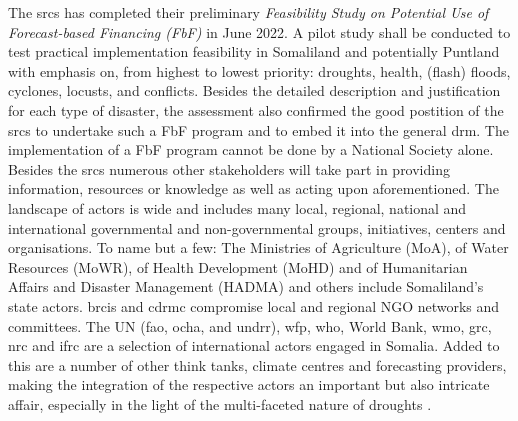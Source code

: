 The \acrfull{srcs} has completed their preliminary \textit{Feasibility Study on Potential Use of Forecast-based Financing (FbF)} in June 2022. A pilot study shall be conducted to test practical implementation feasibility in Somaliland and potentially Puntland with emphasis on, from highest to lowest priority: droughts, health, (flash) floods, cyclones, locusts, and conflicts. Besides the detailed description and justification for each type of disaster, the assessment also confirmed the good postition of the \acrshort{srcs} to undertake such a FbF program and to embed it into the general \acrlong{drm}.\newline
The implementation of a FbF program cannot be done by a National Society alone. Besides the \acrshort{srcs} numerous other stakeholders will take part in providing information, resources or knowledge as well as acting upon aforementioned. The landscape of actors is wide and includes many local, regional, national and international governmental and non-governmental groups, initiatives, centers and organisations. To name but a few: The Ministries of Agriculture (MoA), of Water Resources (MoWR), of Health Development (MoHD) and of Humanitarian Affairs and Disaster Management (HADMA) and others include Somaliland's state actors. \acrfull{brcis} and \acrfull{cdrmc} compromise local and regional NGO networks and committees. The UN (\acrshort{fao}, \acrshort{ocha}, and \acrshort{undrr}), \acrshort{wfp}, \acrshort{who}, World Bank, \acrshort{wmo}, \acrshort{grc}, \acrshort{nrc} and \acrshort{ifrc} are a selection of international actors engaged in Somalia. Added to this are a number of other think tanks, climate centres and forecasting providers, making the integration of the respective actors an important but also intricate affair, especially in the light of the multi-faceted nature of droughts \autocite{rcrcFORECASTBASEDFINANCINGEARLY2020,scrsFeasibilityStudyPotential2022}.

